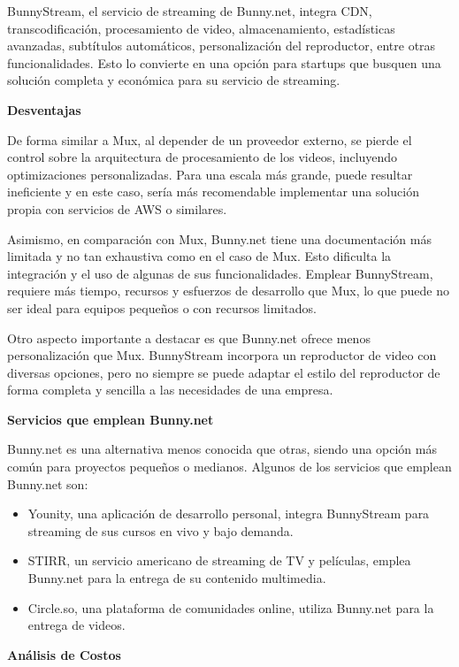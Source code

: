 BunnyStream, el servicio de streaming de Bunny.net, integra CDN, transcodificación, procesamiento de video, almacenamiento, estadísticas avanzadas, subtítulos automáticos, personalización del reproductor, entre otras funcionalidades. Esto lo convierte en una opción para startups que busquen una solución completa y económica para su servicio de streaming.




\textbf{Desventajas}

De forma similar a Mux, al depender de un proveedor externo, se pierde el control sobre la arquitectura de procesamiento de los videos, incluyendo optimizaciones personalizadas. Para una escala más grande, puede resultar ineficiente y en este caso, sería más recomendable implementar una solución propia con servicios de AWS o similares.

Asimismo, en comparación con Mux, Bunny.net tiene una documentación más limitada y no tan exhaustiva como en el caso de Mux. Esto dificulta la integración y el uso de algunas de sus funcionalidades. Emplear BunnyStream, requiere más tiempo, recursos y esfuerzos de desarrollo que Mux, lo que puede no ser ideal para equipos pequeños o con recursos limitados. 

Otro aspecto importante a destacar es que Bunny.net ofrece menos personalización que Mux. BunnyStream incorpora un reproductor de video con diversas opciones, pero no siempre se puede adaptar el estilo del reproductor de forma completa y sencilla a las necesidades de una empresa. 

\textbf{Servicios que emplean Bunny.net}

Bunny.net es una alternativa menos conocida que otras, siendo una opción más común para proyectos pequeños o medianos. Algunos de los servicios que emplean Bunny.net son:

\begin{itemize}
    \item Younity, una aplicación de desarrollo personal, integra BunnyStream para streaming de sus cursos en vivo y bajo demanda.
    \item STIRR, un servicio americano de streaming de TV y películas, emplea Bunny.net para la entrega de su contenido multimedia.
    \item Circle.so, una plataforma de comunidades online, utiliza Bunny.net para la entrega de videos. 
\end{itemize}

\textbf{Análisis de Costos}

